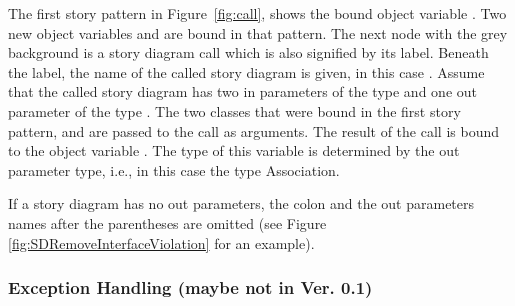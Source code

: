 The first story pattern in Figure~\ref{fig:call}, shows the bound object variable . Two new object variables  and  are bound in that pattern. The next node with the grey background is a story diagram call which is also signified by its label. Beneath the label, the name of the called story diagram is given, in this case . Assume that the called story diagram has two in parameters of the type  and one out parameter of the type . The two classes that were bound in the first story pattern,  and  are passed to the call as arguments.
The result of the call is bound to the object variable . The type of this variable is determined by the out parameter type, i.e., in this case the type Association.

If a story diagram has no out parameters, the colon and the out parameters names after the parentheses are omitted (see Figure \ref{fig:SDRemoveInterfaceViolation} for an example).


\subsubsection{Exception Handling (maybe not in Ver. 0.1)}
